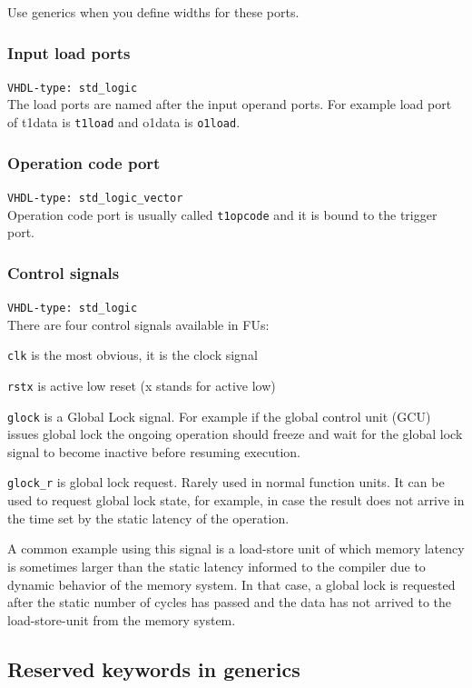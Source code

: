 \documentclass[a4paper,twoside]{tceusermanual}
\begin{document}
Use generics when you define widths for these ports.

\subsubsection{Input load ports}
\verb|VHDL-type: std_logic| \\
The load ports are named after the input operand ports. For example load port
of t1data is \verb|t1load| and o1data is \verb|o1load|.

\subsubsection{Operation code port}
\verb|VHDL-type: std_logic_vector| \\
Operation code port is usually called \verb|t1opcode| and it is bound to the
trigger port.

\subsubsection{Control signals}
\verb|VHDL-type: std_logic| \\
There are four control signals available in FUs:

\verb|clk| is the most obvious, it is the clock signal

\verb|rstx| is active low reset (x stands for active low)

\verb|glock| is a Global Lock signal. For example if the global control unit
(GCU) issues global lock the ongoing operation should freeze and wait for
the global lock signal to become inactive before resuming execution.

\verb|glock_r| is global lock request. Rarely used in normal function units.
It can be used to request global lock state, for example, in case the
result does not arrive in the time set by the static latency of the
operation. 

A common example using this signal is a load-store unit of which
memory latency is sometimes larger than the static latency informed to the
compiler due to dynamic behavior of the memory system. In that case, a
global lock is requested after the static number of cycles has passed and
the data has not arrived to the load-store-unit from the memory system.

\subsection{Reserved keywords in generics}
\end{document}
